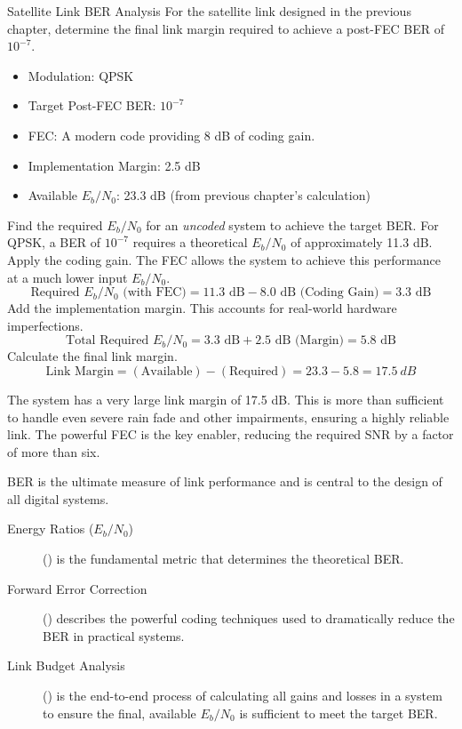 \begin{workedexample}{Satellite Link BER Analysis}
     For the satellite link designed in the previous chapter, determine the final link margin required to achieve a post-FEC BER of $10^{-7}$.
    \begin{itemize}
        \item Modulation: QPSK
        \item Target Post-FEC BER: $10^{-7}$
        \item FEC: A modern code providing 8 dB of coding gain.
        \item Implementation Margin: 2.5 dB
        \item Available $E_b/N_0$: 23.3 dB (from previous chapter's calculation)
    \end{itemize}
    \begin{derivationsteps}
        \step Find the required $E_b/N_0$ for an \emph{uncoded} system to achieve the target BER. For QPSK, a BER of $10^{-7}$ requires a theoretical $E_b/N_0$ of approximately 11.3 dB.
        \step Apply the coding gain. The FEC allows the system to achieve this performance at a much lower input $E_b/N_0$.
        \[ \text{Required } E_b/N_0 \text{ (with FEC)} = 11.3 \text{ dB} - 8.0 \text{ dB (Coding Gain)} = 3.3 \text{ dB} \]
        \step Add the implementation margin. This accounts for real-world hardware imperfections.
        \[ \text{Total Required } E_b/N_0 = 3.3 \text{ dB} + 2.5 \text{ dB (Margin)} = 5.8 \text{ dB} \]
        \step Calculate the final link margin.
        \[ \text{Link Margin} = (\text{Available}) - (\text{Required}) = 23.3 - 5.8 = \qty{17.5}{dB} \]
    \end{derivationsteps}
     The system has a very large link margin of 17.5 dB. This is more than sufficient to handle even severe rain fade and other impairments, ensuring a highly reliable link. The powerful FEC is the key enabler, reducing the required SNR by a factor of more than six.
\end{workedexample}


\begin{importantbox}[title={Further Reading}]
    BER is the ultimate measure of link performance and is central to the design of all digital systems.
    \begin{description}
        \item[Energy Ratios ($E_b/N_0$)] () is the fundamental metric that determines the theoretical BER.
        \item[Forward Error Correction] () describes the powerful coding techniques used to dramatically reduce the BER in practical systems.
        \item[Link Budget Analysis] () is the end-to-end process of calculating all gains and losses in a system to ensure the final, available $E_b/N_0$ is sufficient to meet the target BER.
    \end{description}
\end{importantbox}